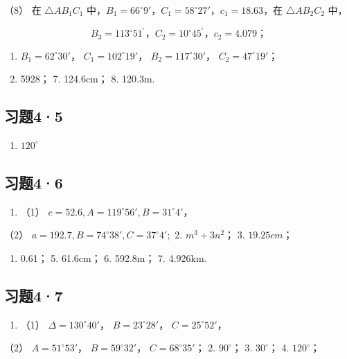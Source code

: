 （8） 在 \(\triangle AB_{1}C_{1}\)
中，\(B_{1} = 66^{\circ}9'\)，\(C_{1} = 58^{\circ}27'\)，\(c_{1} = 18.63\)，在
\(\triangle AB_{2}C_{2}\) 中，

\[
B _ {3} = 113 ^{\circ} 51 ^{\prime}\text{，} C _ {2} = 10 ^{\circ} 45 ^{\prime}\text{，} c _ {2} = 4.079\text{；}
\]

\begin{enumerate}[start=3]
\item
  \(B_{1} = 62^{\circ}30'\)， \(C_{1} = 102^{\circ}19'\)，
  \(B_{2} = 117^{\circ}30'\)， \(C_{2} = 47^{\circ}19'\)；
\item
  5928； 7. 124.6cm； 8. 120.3m.
\end{enumerate}

\subsection{习题4·5}

\begin{enumerate}[start=5]
\item
  \(120^{\circ}\)
\end{enumerate}

\subsection{习题4·6}

\begin{enumerate}
\item
  （1） \(c = 52.6, A = 119^{\circ}56', B = 31^{\circ}4'\)，
\end{enumerate}

（2） \(a = 192.7, B = 74^{\circ}38', C = 37^{\circ}4';\) 2.
\(m^{3} + 3n^{2}\)； 3. \(19.25cm\)；

\begin{enumerate}[start=4]
\item
  0.61； 5. 61.6cm； 6. 592.8m； 7. 4.926km.
\end{enumerate}

\subsection{习题4·7}

\begin{enumerate}
\item
  （1） \(\Delta = 130^{\circ}40'\)， \(B = 23^{\circ}28'\)，
  \(C = 25^{\circ}52'\)，
\end{enumerate}

（2） \(A = 51^{\circ}53'\)， \(B = 59^{\circ}32'\)，
\(C = 68^{\circ}35'\)； 2. \(90^{\circ}\)； 3. \(30^{\circ}\)； 4.
\(120^{\circ}\)；

